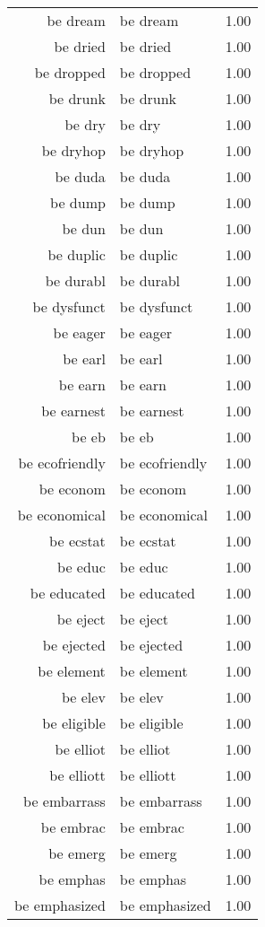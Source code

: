 \begin{table}[ht]
\begin{tabular}{rlr}
  be dream & be dream & 1.00 \\ 
  be dried & be dried & 1.00 \\ 
  be dropped & be dropped & 1.00 \\ 
  be drunk & be drunk & 1.00 \\ 
  be dry & be dry & 1.00 \\ 
  be dryhop & be dryhop & 1.00 \\ 
  be duda & be duda & 1.00 \\ 
  be dump & be dump & 1.00 \\ 
  be dun & be dun & 1.00 \\ 
  be duplic & be duplic & 1.00 \\ 
  be durabl & be durabl & 1.00 \\ 
  be dysfunct & be dysfunct & 1.00 \\ 
  be eager & be eager & 1.00 \\ 
  be earl & be earl & 1.00 \\ 
  be earn & be earn & 1.00 \\ 
  be earnest & be earnest & 1.00 \\ 
  be eb & be eb & 1.00 \\ 
  be ecofriendly & be ecofriendly & 1.00 \\ 
  be econom & be econom & 1.00 \\ 
  be economical & be economical & 1.00 \\ 
  be ecstat & be ecstat & 1.00 \\ 
  be educ & be educ & 1.00 \\ 
  be educated & be educated & 1.00 \\ 
  be eject & be eject & 1.00 \\ 
  be ejected & be ejected & 1.00 \\ 
  be element & be element & 1.00 \\ 
  be elev & be elev & 1.00 \\ 
  be eligible & be eligible & 1.00 \\ 
  be elliot & be elliot & 1.00 \\ 
  be elliott & be elliott & 1.00 \\ 
  be embarrass & be embarrass & 1.00 \\ 
  be embrac & be embrac & 1.00 \\ 
  be emerg & be emerg & 1.00 \\ 
  be emphas & be emphas & 1.00 \\ 
  be emphasized & be emphasized & 1.00 \\ 

\end{tabular}
\end{table}
